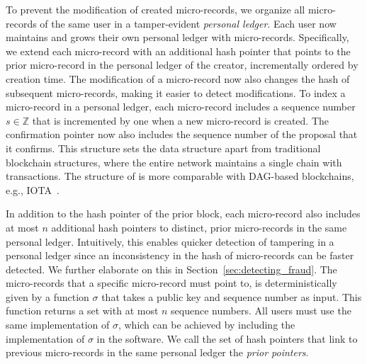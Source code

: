 To prevent the modification of created micro-records, we organize all micro-records of the same user in a tamper-evident \emph{personal ledger}.
Each user now maintains and grows their own personal ledger with micro-records.
Specifically, we extend each micro-record with an additional hash pointer that points to the prior micro-record in the personal ledger of the creator, incrementally ordered by creation time.
The modification of a micro-record now also changes the hash of subsequent micro-records, making it easier to detect modifications.
To index a micro-record in a personal ledger, each micro-record includes a sequence number $ s \in \mathbb{Z} $ that is incremented by one when a new micro-record is created.
The confirmation pointer now also includes the sequence number of the proposal that it confirms.
This structure sets the \ModelName{} data structure apart from traditional blockchain structures, where the entire network maintains a single chain with transactions.
The structure of \ModelName{} is more comparable with DAG-based blockchains, e.g., IOTA~\cite{popov2018tangle}.

In addition to the hash pointer of the prior block, each micro-record also includes at most $ n $ additional hash pointers to distinct, prior micro-records in the same personal ledger.
Intuitively, this enables quicker detection of tampering in a personal ledger since an inconsistency in the hash of micro-records can be faster detected.
We further elaborate on this in Section~\ref{sec:detecting_fraud}.
The micro-records that a specific micro-record must point to, is deterministically given by a function $ \sigma $ that takes a public key and sequence number as input.
This function returns a set with at most $ n $ sequence numbers.
All users must use the same implementation of $ \sigma $, which can be achieved by including the implementation of $ \sigma $ in the \ModelName{} software.
We call the set of hash pointers that link to previous micro-records in the same personal ledger the \emph{prior pointers}.

